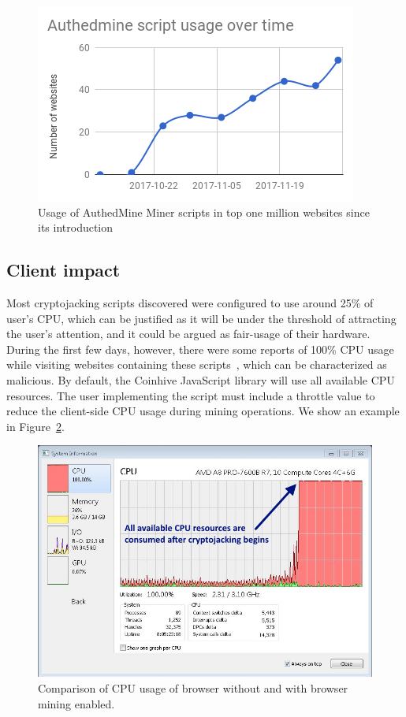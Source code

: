 \begin{figure}[h]
\centering
\includegraphics[width=0.9\linewidth]{figures/usage_of_authedmine_over_time.png}
	\caption{Usage of AuthedMine Miner scripts in top one million websites since its introduction} \label{fig:authmine}
\end{figure}

\subsection{Client impact}



Most cryptojacking scripts discovered were configured to use around 25\% of user's CPU, which can be justified as it will be under the threshold of attracting the user's attention, and it could be argued as fair-usage of their hardware. During the first few days, however, there were some reports of 100\% CPU usage while visiting websites containing these scripts~\cite{piratesbayblog}, which can be characterized as malicious. By default, the Coinhive JavaScript library will use all available CPU resources. The user implementing the script must include a throttle value to reduce the client-side CPU usage during mining operations. We show an example in Figure~\ref{fig:cpu}.

\begin{figure}[h]
\centering
\includegraphics[width=\linewidth]{figures/windows_cpu_usage.png}
	\caption{Comparison of CPU usage of browser without and with browser mining enabled.}\label{fig:cpu}
\end{figure}


